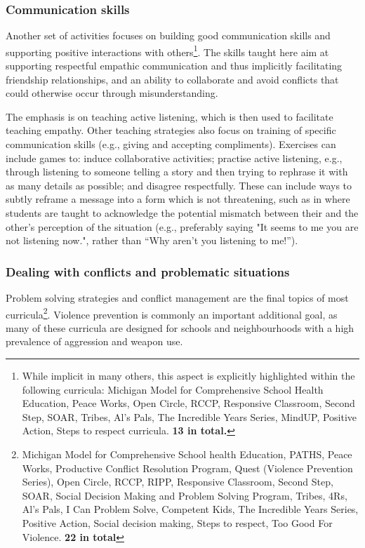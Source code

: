 \documentclass[prodmode,acmtochi]{acmsmall}
\newcommand{\todo}[1]{\textrm{\textrm{\textcolor{LightBlue}{[[#1]]}}}}
\begin{document}
\subsubsection{Communication skills}%
Another set of activities focuses on building good communication skills and supporting positive interactions with others\footnote{While implicit in many others, this aspect is explicitly highlighted within the following curricula: Michigan Model for Comprehensive School Health Education, Peace  Works, Open Circle, RCCP, Responsive Classroom, Second Step, SOAR, Tribes, Al's Pals, The Incredible Years Series, MindUP, Positive Action, Steps to respect curricula. {\bf 13 in total.}}. The skills taught here aim at supporting respectful empathic communication and thus implicitly facilitating friendship relationships, and an ability to collaborate and avoid conflicts that could otherwise occur through misunderstanding. 

The emphasis is on teaching active listening, which is then used to facilitate teaching empathy. Other teaching strategies also focus on training of specific communication skills (e.g., giving and accepting compliments).
Exercises can include games to: induce collaborative activities; practise active listening, e.g., through listening to someone telling a story and then trying to rephrase it with as many details as possible; and disagree respectfully. These can include ways to subtly reframe a message into a form which is not threatening, such as in  where students are taught to acknowledge the potential mismatch between their and the other's perception of the situation (e.g., preferably saying "It seems to me you are not listening now.", rather than ``Why aren't you listening to me!'').%

\subsubsection{Dealing with conflicts and problematic situations} 
Problem solving strategies and conflict management are the final topics of most curricula\footnote{Michigan Model for Comprehensive School health Education, PATHS, Peace Works, Productive Conflict Resolution Program, Quest (Violence Prevention Series), Open Circle, RCCP, RIPP, Responsive Classroom, Second Step, SOAR, Social Decision Making and Problem Solving Program, Tribes, 4Rs, Al's Pals, I Can Problem Solve, Competent Kids, The Incredible Years Series, Positive Action, Social decision making, Steps to respect, Too Good For Violence. {\bf 22 in total}}.  Violence prevention is commonly an important additional goal, as many of these curricula are designed  for schools and neighbourhoods with a high prevalence of aggression and weapon use. 
\end{document}
